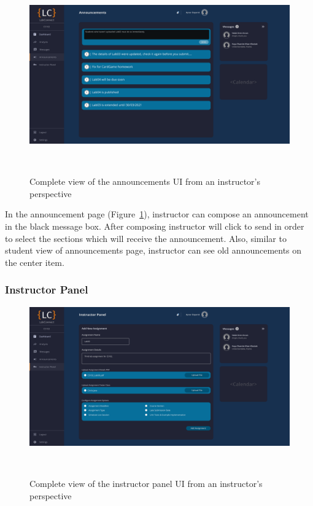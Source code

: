 \documentclass[a4paper, 12pt]{article}
\begin{document}
    \begin{figure}[H]
        \centering
        \includegraphics[width=\textwidth]{instructor_announcements}
        \caption{Complete view of the announcements UI from an instructor's perspective}~\label{fig:instructor_announcements_full}
    \end{figure}
        
    In the announcement page (Figure~\ref{fig:instructor_announcements_full}), instructor can compose an announcement in the black message box. After composing instructor will click to send
    in order to select the sections which will receive the announcement. Also, similar to student view of announcements page, instructor can see old announcements on the center item.
    
    
    
    \pagebreak
    
    \subsubsection{Instructor Panel}
    
    \begin{figure}[H]
        \centering
        \includegraphics[width=\textwidth]{instructor_admin_panel}
        \caption{Complete view of the instructor panel UI from an instructor's perspective}~\label{fig:instructor_admin_panel_full}
    \end{figure}
    
\end{document}
